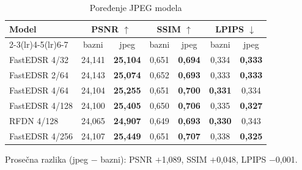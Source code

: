 \begin{table}[H]
    \begin{tabular}{lcccccc}
        \toprule
        Model & \multicolumn{2}{c}{PSNR $\uparrow$} & \multicolumn{2}{c}{SSIM $\uparrow$} & \multicolumn{2}{c}{LPIPS $\downarrow$} \\
        \cmidrule(lr){2-3}\cmidrule(lr){4-5}\cmidrule(lr){6-7}
         & bazni & jpeg & bazni & jpeg & bazni & jpeg \\
        \midrule
        FastEDSR 4/32 & 24,141 & \textbf{25,104} & 0,651 & \textbf{0,694} & 0,334 & \textbf{0,333} \\
        FastEDSR 2/64 & 24,143 & \textbf{25,074} & 0,652 & \textbf{0,693} & 0,333 & \textbf{0,333} \\
        FastEDSR 4/64 & 24,104 & \textbf{25,255} & 0,651 & \textbf{0,700} & \textbf{0,331} & 0,334 \\
        FastEDSR 4/128 & 24,100 & \textbf{25,405} & 0,650 & \textbf{0,706} & 0,335 & \textbf{0,327} \\
        RFDN 4/128 & 24,065 & \textbf{24,907} & 0,649 & \textbf{0,693} & \textbf{0,330} & 0,343 \\
        FastEDSR 4/256 & 24,107 & \textbf{25,449} & 0,651 & \textbf{0,707} & 0,338 & \textbf{0,325} \\
        \bottomrule
    \end{tabular}
    \caption{Poređenje JPEG modela}
    \label{tab:jpeg_Set14_jpeg}
\end{table}

\noindent Prosečna razlika (jpeg $-$ bazni): PSNR $+$1,089, SSIM $+$0,048, LPIPS $-$0,001.